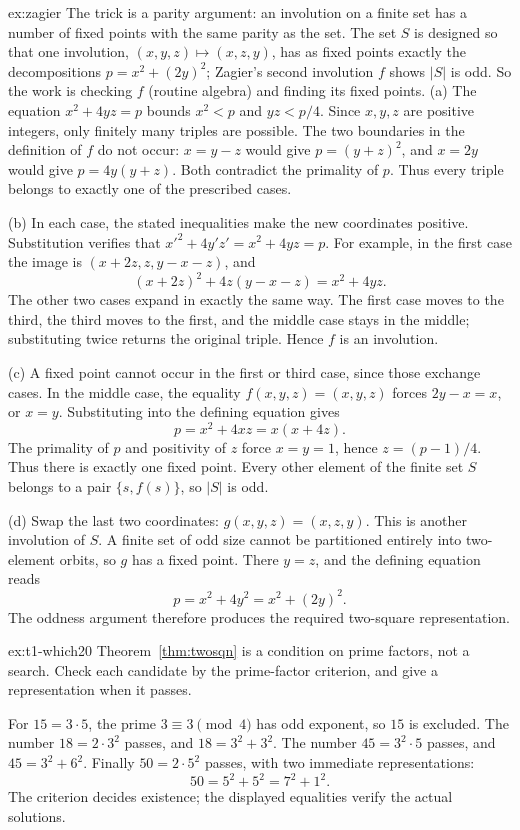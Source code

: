 \begin{solution}{ex:zagier}
\idea The trick is a parity argument: an involution on a finite set has a number of fixed points with the same parity as the set. The set $S$ is designed so that one involution, $(x,y,z)\mapsto(x,z,y)$, has as fixed points exactly the decompositions $p=x^2+(2y)^2$; Zagier's second involution $f$ shows $|S|$ is odd. So the work is checking $f$ (routine algebra) and finding its fixed points.
\writeup (a) The equation $x^2+4yz=p$ bounds $x^2<p$ and $yz<p/4$. Since $x,y,z$ are positive integers, only finitely many triples are possible. The two boundaries in the definition of $f$ do not occur: $x=y-z$ would give $p=(y+z)^2$, and $x=2y$ would give $p=4y(y+z)$. Both contradict the primality of $p$. Thus every triple belongs to exactly one of the prescribed cases.

(b) In each case, the stated inequalities make the new coordinates positive. Substitution verifies that $x'^2+4y'z'=x^2+4yz=p$. For example, in the first case the image is $(x+2z,z,y-x-z)$, and
\[
(x+2z)^2+4z(y-x-z)=x^2+4yz.
\]
The other two cases expand in exactly the same way. The first case moves to the third, the third moves to the first, and the middle case stays in the middle; substituting twice returns the original triple. Hence $f$ is an involution.

(c) A fixed point cannot occur in the first or third case, since those exchange cases. In the middle case, the equality $f(x,y,z)=(x,y,z)$ forces $2y-x=x$, or $x=y$. Substituting into the defining equation gives
\[
p=x^2+4xz=x(x+4z).
\]
The primality of $p$ and positivity of $z$ force $x=y=1$, hence $z=(p-1)/4$. Thus there is exactly one fixed point. Every other element of the finite set $S$ belongs to a pair $\{s,f(s)\}$, so $|S|$ is odd.

(d) Swap the last two coordinates: $g(x,y,z)=(x,z,y)$. This is another involution of $S$. A finite set of odd size cannot be partitioned entirely into two-element orbits, so $g$ has a fixed point. There $y=z$, and the defining equation reads
\[
p=x^2+4y^2=x^2+(2y)^2.
\]
The oddness argument therefore produces the required two-square representation.
\end{solution}

\begin{solution}{ex:t1-which20}
\idea Theorem~\ref{thm:twosqn} is a condition on prime factors, not a search.
\writeup Check each candidate by the prime-factor criterion, and give a representation when it passes.

For $15=3\cdot5$, the prime $3\equiv3\pmod4$ has odd exponent, so $15$ is excluded. The number $18=2\cdot3^2$ passes, and $18=3^2+3^2$. The number $45=3^2\cdot5$ passes, and $45=3^2+6^2$. Finally $50=2\cdot5^2$ passes, with two immediate representations:
\[
50=5^2+5^2=7^2+1^2.
\]
The criterion decides existence; the displayed equalities verify the actual solutions.
\end{solution}

